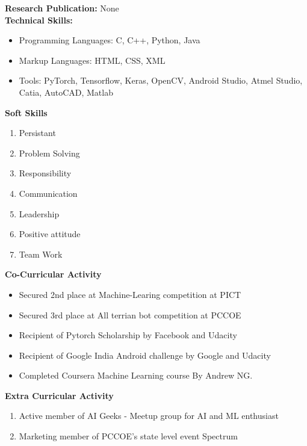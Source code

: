 \documentclass[10pt,twoside,a4paper]{article}
\begin{document}
\noindent
\textbf{Research Publication:}
None\\

\newpage
\noindent
\textbf{Technical Skills:}
\begin{itemize}
\item Programming Languages:
C, C++, Python, Java
\item Markup Languages:
HTML, CSS, XML
\item Tools:
PyTorch, Tensorflow, Keras, OpenCV, Android Studio, Atmel Studio, Catia, AutoCAD, Matlab
\\
\end{itemize}
		
\noindent
\textbf{Soft Skills}
\begin{enumerate}
\item Persistant
\item Problem Solving
\item Responsibility
\item Communication
\item Leadership
\item Positive attitude
\item Team Work 
\\
\end{enumerate}

\noindent
\textbf{Co-Curricular Activity}
\begin{itemize}
\item Secured 2nd place at Machine-Learing competition at PICT
\item Secured 3rd place at All terrian bot competition at PCCOE 
\item Recipient of Pytorch Scholarship by Facebook and Udacity
\item Recipient of Google India Android challenge by Google and Udacity
\item Completed Coursera Machine Learning course By Andrew NG.\\
\end{itemize}


\noindent
\textbf{Extra Curricular Activity}
\begin{enumerate}
\item Active member of AI Geeks - Meetup group for AI and ML enthusiast
\item Marketing member of PCCOE's state level event Spectrum\\
\end{enumerate}
\end{document}
